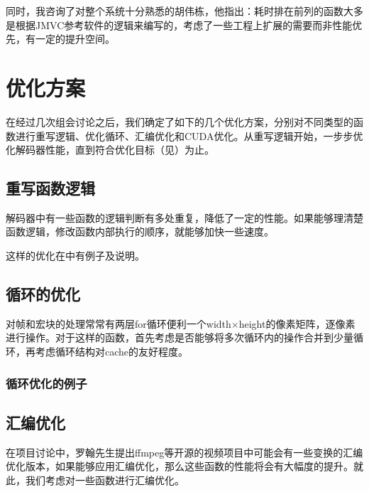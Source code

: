 同时，我咨询了对整个系统十分熟悉的胡伟栋，他指出：耗时排在前列的函数大多是根据JMVC参考软件的逻辑来编写的，考虑了一些工程上扩展的需要而非性能优先，有一定的提升空间。

\section{优化方案}
\label{sec:optapproach}

在经过几次组会讨论之后，我们确定了如下的几个优化方案，分别对不同类型的函数进行重写逻辑、优化循环、汇编优化和CUDA优化。从重写逻辑开始，一步步优化解码器性能，直到符合优化目标（见）为止。

\subsection{重写函数逻辑}
\label{subsec:rewritelogic}

解码器中有一些函数的逻辑判断有多处重复，降低了一定的性能。如果能够理清楚函数逻辑，修改函数内部执行的顺序，就能够加快一些速度。

这样的优化在中有例子及说明。

\subsection{循环的优化}
\label{subsec:loopopt}

对帧和宏块的处理常常有两层for循环便利一个width$\times$height的像素矩阵，逐像素进行操作。对于这样的函数，首先考虑是否能够将多次循环内的操作合并到少量循环，再考虑循环结构对cache的友好程度。

\subsubsection{循环优化的例子}
\label{subsubsec:egloopopt}

\subsection{汇编优化}
\label{subsec:asmopt}

在项目讨论中，罗翰先生提出ffmpeg等开源的视频项目中可能会有一些变换的汇编优化版本，如果能够应用汇编优化，那么这些函数的性能将会有大幅度的提升。就此，我们考虑对一些函数进行汇编优化。

